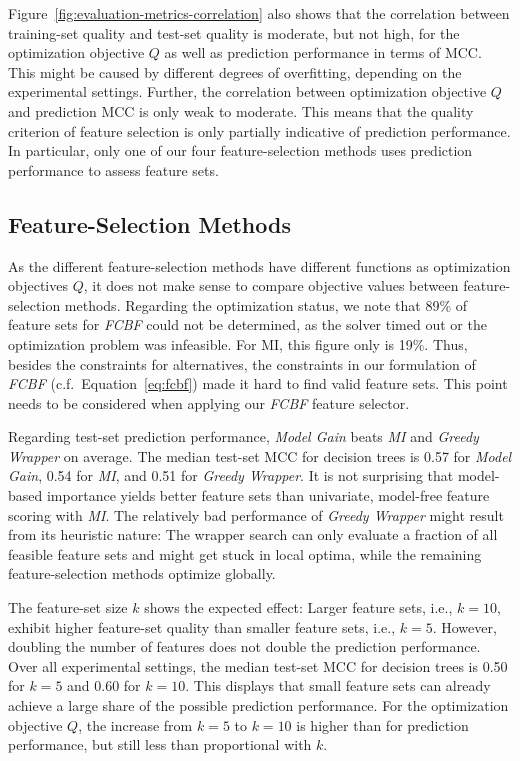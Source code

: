 \documentclass[conference]{IEEEtran}
\theoremstyle{definition}
\begin{document}
Figure~\ref{fig:evaluation-metrics-correlation} also shows that the correlation between training-set quality and test-set quality is moderate, but not high, for the optimization objective $Q$ as well as prediction performance in terms of MCC.
This might be caused by different degrees of overfitting, depending on the experimental settings.
Further, the correlation between optimization objective $Q$ and prediction MCC is only weak to moderate.
This means that the quality criterion of feature selection is only partially indicative of prediction performance.
In particular, only one of our four feature-selection methods uses prediction performance to assess feature sets.

\subsection{Feature-Selection Methods}

As the different feature-selection methods have different functions as optimization objectives $Q$, it does not make sense to compare objective values between feature-selection methods.
Regarding the optimization status, we note that 89\% of feature sets for \emph{FCBF} could not be determined, as the solver timed out or the optimization problem was infeasible.
For MI, this figure only is 19\%.
Thus, besides the constraints for alternatives, the constraints in our formulation of \emph{FCBF} (c.f.~Equation~\ref{eq:fcbf}) made it hard to find valid feature sets.
This point needs to be considered when applying our \emph{FCBF} feature selector.

Regarding test-set prediction performance, \emph{Model Gain} beats \emph{MI} and \emph{Greedy Wrapper} on average.
The median test-set MCC for decision trees is 0.57 for \emph{Model Gain}, 0.54 for \emph{MI}, and 0.51 for \emph{Greedy Wrapper}.
It is not surprising that model-based importance yields better feature sets than univariate, model-free feature scoring with \emph{MI}.
The relatively bad performance of \emph{Greedy Wrapper} might result from its heuristic nature:
The wrapper search can only evaluate a fraction of all feasible feature sets and might get stuck in local optima, while the remaining feature-selection methods optimize globally.

The feature-set size $k$ shows the expected effect:
Larger feature sets, i.e., $k=10$, exhibit higher feature-set quality than smaller feature sets, i.e., $k=5$.
However, doubling the number of features does not double the prediction performance.
Over all experimental settings, the median test-set MCC for decision trees is 0.50 for $k=5$ and 0.60 for $k=10$.
This displays that small feature sets can already achieve a large share of the possible prediction performance.
For the optimization objective $Q$, the increase from $k=5$ to $k=10$ is higher than for prediction performance, but still less than proportional with $k$.
\end{document}
